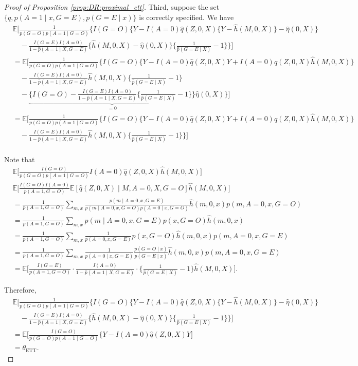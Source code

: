 \documentclass[10pt]{article}
\newcommand{\E}{\mathbb{E}}
\begin{document}
\begin{proof}[Proof of Proposition \ref{prop:DR:proximal_ett}]
Third, suppose the set $\{q,p(A=1\mid x,G=E),p(G=E\mid x)\}$ is correctly specified. We have
{\footnotesize \begin{align*}
&\E\Big[\frac{1}{p(G=O)p(A=1\mid G=O)}\Big\{I(G=O)\big\{Y-I(A=0)\hat{q}(Z,0,X)\{Y-\hat{h}(M,0,X)\}-\hat{\eta}(0,X)\big\}\\
&\quad-\frac{I(G=E)I(A=0)}{1-\hat{p}(A=1\mid X,G=E)}
\{\hat{h}(M,0,X)-\hat{\eta}(0,X)\}\{\frac{1}{\hat{p}(G=E\mid X)}-1\}\Big\}\Big]\\
&=\E\Big[\frac{1}{p(G=O)p(A=1\mid G=O)}\Big\{I(G=O)\big\{Y-I(A=0)\hat{q}(Z,0,X)Y+I(A=0)\hat{q}(Z,0,X)\hat{h}(M,0,X)\big\}\\
&\quad-\frac{I(G=E)I(A=0)}{1-\hat{p}(A=1\mid X,G=E)}
\hat{h}(M,0,X)\{\frac{1}{\hat{p}(G=E\mid X)}-1\}\\
&\quad-\underbrace{\big\{I(G=O)-\frac{I(G=E)I(A=0)}{1-\hat{p}(A=1\mid X,G=E)}\{\frac{1}{\hat{p}(G=E\mid X)}-1\}\big\}}_{=0}\hat{\eta}(0,X)\Big\}\Big]\\
&=\E\Big[\frac{1}{p(G=O)p(A=1\mid G=O)}\Big\{I(G=O)\big\{Y-I(A=0)\hat{q}(Z,0,X)Y+I(A=0)\hat{q}(Z,0,X)\hat{h}(M,0,X)\big\}\\
&\quad-\frac{I(G=E)I(A=0)}{1-\hat{p}(A=1\mid X,G=E)}
\hat{h}(M,0,X)\{\frac{1}{\hat{p}(G=E\mid X)}-1\}\Big\}\Big]\\
\end{align*}}

Note that
\begin{align*}
&\E\Big[\frac{I(G=O)}{p(G=O)p(A=1\mid G=O)}I(A=0)\hat{q}(Z,0,X)\hat{h}(M,0,X)\Big]\\
&\E\Big[\frac{I(G=O)I(A=0)}{p(A=1,G=O)}\E[\hat{q}(Z,0,X)\mid M,A=0,X,G=O]\hat{h}(M,0,X)\Big]\\
&=\frac{1}{p(A=1,G=O)}\sum_{m,x}\frac{p(m\mid A=0,x,G=E)}{p(m\mid A=0,x,G=O)p(A=0\mid x,G=O)}\hat{h}(m,0,x)p(m,A=0,x,G=O)\\
&=\frac{1}{p(A=1,G=O)}\sum_{m,x}p(m\mid A=0,x,G=E)p(x,G=O)\hat{h}(m,0,x)\\
&=\frac{1}{p(A=1,G=O)}\sum_{m,x}\frac{1}{p(A=0,x,G=E)}p(x,G=O)\hat{h}(m,0,x)p(m,A=0,x,G=E)\\
&=\frac{1}{p(A=1,G=O)}\sum_{m,x}\frac{1}{p(A=0\mid x,G=E)}\frac{p(G=O\mid x)}{p(G=E\mid x)}\hat{h}(m,0,x)p(m,A=0,x,G=E)\\
&=\E\Big[\frac{I(G=E)}{p(A=1,G=O)}\cdot\frac{I(A=0)}{1-\hat{p}(A=1\mid X,G=E)}\cdot\{\frac{1}{\hat{p}(G=E\mid X)}-1\}\hat{h}(M,0,X)\Big].
\end{align*}

Therefore,
\begin{align*}
&\E\Big[\frac{1}{p(G=O)p(A=1\mid G=O)}\Big\{I(G=O)\big\{Y-I(A=0)\hat{q}(Z,0,X)\{Y-\hat{h}(M,0,X)\}-\hat{\eta}(0,X)\big\}\\
&\quad-\frac{I(G=E)I(A=0)}{1-\hat{p}(A=1\mid X,G=E)}
\{\hat{h}(M,0,X)-\hat{\eta}(0,X)\}\{\frac{1}{\hat{p}(G=E\mid X)}-1\}\Big\}\Big]\\
&=\E\Big[\frac{I(G=O)}{p(G=O)p(A=1\mid G=O)}\big\{Y-I(A=0)\hat{q}(Z,0,X)Y\Big]\\
&=\theta_{\text{ETT}}.
\end{align*}
\end{proof}
\end{document}
